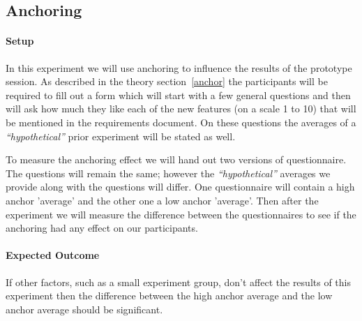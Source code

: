 \subsection{Anchoring}
\label{expTheory}
\paragraph{Setup}In this experiment we will use anchoring to influence the results of the prototype session. As described in the theory section~\ref{anchor} the participants will be required to fill out a form which will start with a few general questions and then will ask how much they like each of the new features (on a scale 1 to 10) that will be mentioned in the requirements document. On these questions the averages of a {\it``hypothetical''} prior experiment will be stated as well. 

To measure the anchoring effect we will hand out two versions of questionnaire. The questions will remain the same; however the {\it``hypothetical''} averages we provide along with the questions will differ. One questionnaire will contain a high anchor 'average' and the other one a low anchor 'average'. Then after the experiment we will measure the difference between the questionnaires to see if the anchoring had any effect on our participants.

\paragraph{Expected Outcome}If other factors, such as a small experiment group, don't affect the results of this experiment then the difference between the high anchor average and the low anchor average should be significant.